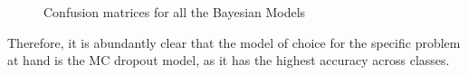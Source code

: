 \documentclass[11pt,twoside]{article}
\numberwithin{Theorem}{section}
\numberwithin{Definition}{section}
\numberwithin{Lemma}{section}
\numberwithin{Algorithm}{section}
\numberwithin{equation}{section}
\begin{document}
\begin{figure}[!h]
    \centering
    \caption{Confusion matrices for all the Bayesian Models}
    \label{fig:confmat_byaesian}
\end{figure}
Therefore, it is abundantly clear that the model of choice for the specific problem at hand is the MC dropout model, as it has the highest accuracy across classes.
\end{document}
